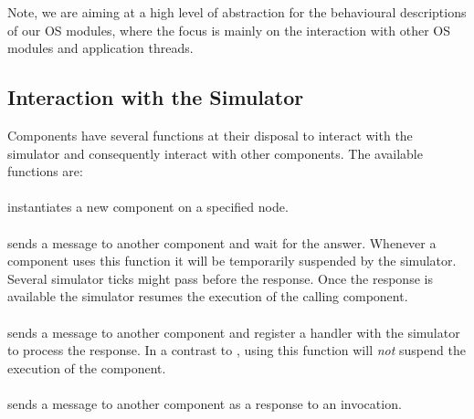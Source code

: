 Note, we are aiming at a high level of abstraction for the behavioural descriptions of our OS modules, where the focus is mainly on the interaction with other OS modules and application threads.


\subsection{Interaction with the Simulator}

%
%

Components have several functions at their disposal to interact with the simulator and consequently interact with other components.
The available functions are:

\paragraph{}
instantiates a new component on a specified node.
\paragraph{}
sends a message to another component and wait for the answer.
Whenever a component uses this function it will be temporarily suspended by the simulator.
Several simulator ticks might pass before the response.
Once the response is available the simulator resumes the execution of the calling component.
\paragraph{}
sends a message to another component and register a handler with the simulator to process the response.
In a contrast to , using this function will \emph{not} suspend the execution of the component.
\paragraph{}
sends a message to another component as a response to an invocation.
